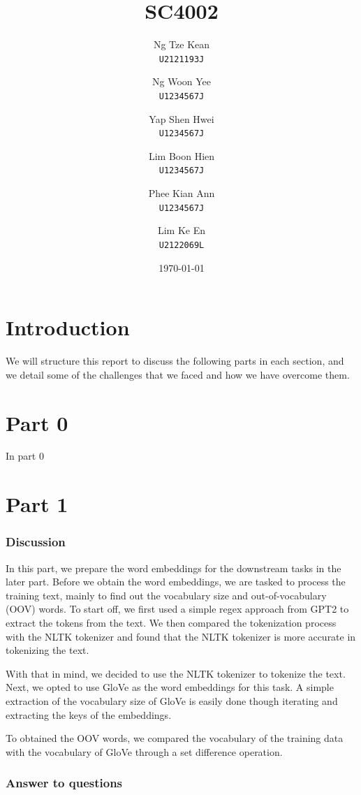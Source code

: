 \documentclass{article}
\title{SC4002}
\author{
  Ng Tze Kean\\
  \texttt{U2121193J} \and
  Ng Woon Yee\\
  \texttt{U1234567J} \and
  Yap Shen Hwei\\
  \texttt{U1234567J} \and
  Lim Boon Hien\\
  \texttt{U1234567J} \and
  Phee Kian Ann\\
  \texttt{U1234567J} \and
  Lim Ke En\\
  \texttt{U2122069L}
}
\date{\today}
\begin{document}
\maketitle

\section*{Introduction}
We will structure this report to discuss the following parts in each section,
and we detail some of the challenges that we faced and how we have overcome
them.

\section*{Part 0}

In part 0

\section*{Part 1}

\subsubsection*{Discussion}

In this part, we prepare the word embeddings for the downstream tasks in the
later part. Before we obtain the word embeddings, we are tasked to process the
training text, mainly to find out the vocabulary size and out-of-vocabulary
(OOV) words. To start off, we first used a simple regex approach from GPT2 to
extract the tokens from the text. We then compared the tokenization process
with the NLTK tokenizer and found that the NLTK tokenizer is more accurate in
tokenizing the text.


With that in mind, we decided to use the NLTK tokenizer to tokenize the text.
Next, we opted to use GloVe as the word embeddings for this task. A simple
extraction of the vocabulary size of GloVe is easily done though iterating and
extracting the keys of the embeddings.

To obtained the OOV words, we compared the vocabulary of the training data with
the vocabulary of GloVe through a set difference operation.

\subsubsection*{Answer to questions}
\end{document}
